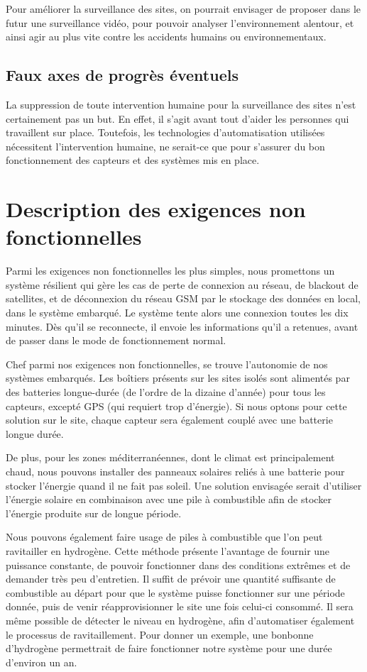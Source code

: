 Pour améliorer la surveillance des sites, on pourrait envisager de proposer dans le futur une surveillance vidéo, pour pouvoir analyser l’environnement alentour, et ainsi agir au plus vite contre les accidents humains ou environnementaux.

\subsection{Faux axes de progrès éventuels}

La suppression de  toute intervention humaine pour la surveillance des sites n’est certainement pas un but. En effet, il s’agit avant tout d’aider les personnes qui travaillent sur place. Toutefois, les technologies d’automatisation utilisées nécessitent l’intervention humaine, ne serait-ce que pour s’assurer du bon fonctionnement des capteurs et des systèmes mis en place.

\section{Description des exigences non fonctionnelles}

Parmi les exigences non fonctionnelles les plus simples, nous promettons un système résilient qui gère les cas de perte de connexion au réseau, de blackout de satellites, et de déconnexion du réseau GSM par le stockage des données en local, dans le système embarqué. Le système tente alors une connexion toutes les dix minutes. Dès qu’il se reconnecte, il envoie les informations qu’il a retenues, avant de passer dans le mode de fonctionnement normal.

Chef parmi nos exigences non fonctionnelles, se trouve l’autonomie de nos systèmes embarqués. Les boîtiers présents sur les sites isolés sont alimentés par des batteries longue-durée (de l’ordre de la dizaine d’année) pour tous les capteurs, excepté GPS (qui requiert trop d’énergie). Si nous optons pour cette solution sur le site, chaque capteur sera également couplé avec une batterie longue durée.

De plus, pour les zones méditerranéennes, dont le climat est principalement chaud, nous pouvons installer des panneaux solaires reliés à une batterie pour stocker l’énergie quand il ne fait pas soleil. Une solution envisagée serait d’utiliser l’énergie solaire en combinaison avec une pile à combustible afin de stocker l’énergie produite sur de longue période.

Nous pouvons également faire usage de piles à combustible que l’on peut ravitailler en hydrogène. Cette méthode présente l’avantage de fournir une puissance constante, de pouvoir fonctionner dans des conditions extrêmes et de demander très peu d’entretien. Il suffit de prévoir une quantité suffisante de combustible au départ pour que le système puisse fonctionner sur une période donnée, puis de venir réapprovisionner le site une fois celui-ci consommé. Il sera même possible de détecter le niveau en hydrogène, afin d’automatiser également le processus de ravitaillement. Pour donner un exemple, une bonbonne d’hydrogène permettrait de faire fonctionner notre système pour une durée d’environ un an. 

